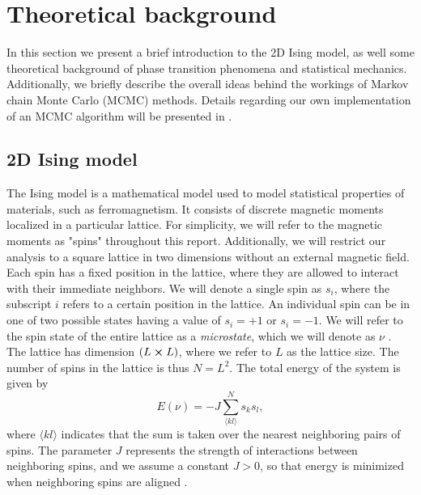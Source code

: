 \section{Theoretical background}\label{sec:theory}

In this section we present a brief introduction to the 2D Ising model, as well some theoretical background of phase transition phenomena and statistical mechanics. Additionally, we briefly describe the overall ideas behind the workings of Markov chain Monte Carlo (MCMC) methods. Details regarding our own implementation of an MCMC algorithm will be presented in .    

\subsection{2D Ising model}\label{subsec_theory:ising_2d}
The Ising model is a mathematical model used to model statistical properties of materials, such as ferromagnetism. It consists of discrete magnetic moments localized in a particular lattice. For simplicity, we will refer to the magnetic moments as "spins" throughout this report. Additionally, we will restrict our analysis to a square lattice in two dimensions without an external magnetic field. Each spin has a fixed position in the lattice, where they are allowed to interact with their immediate neighbors. We will denote a single spin as $s_i$, where the subscript $i$ refers to a certain position in the lattice. An individual spin can be in one of two possible states having a value of $s_i=+1$ or $s_i=-1$. We will refer to the  spin state of the entire lattice as a \textit{microstate}, which we will denote as $\nu$ . The lattice has dimension $(L\cross L)$, where we refer to $L$ as the lattice size. The number of  spins in the lattice is thus $N=L^2$.  The total energy of the system is given by 
\begin{equation} \label{eq:energy}
    E(\nu) = -J \sum_{\langle kl \rangle}^N s_k s_l,
\end{equation}
where $\langle kl\rangle$ indicates that the sum is taken over the nearest neighboring pairs of spins.  The parameter $J$ represents the strength of interactions between neighboring spins, and we assume a constant $J>0$, so that energy is minimized when neighboring spins are aligned . 

